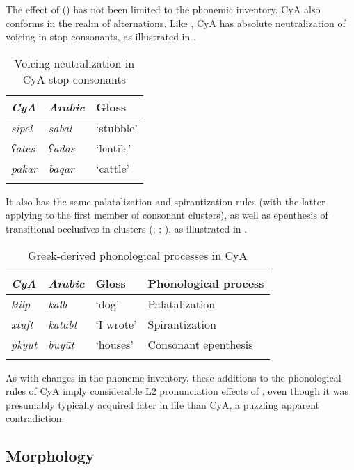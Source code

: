 \documentclass[output=paper]{langsci/langscibook}
\begin{document}
The effect of ()  has not been limited to the phonemic inventory. CyA also conforms in the realm of alternations. Like , CyA has absolute neutralization of voicing in stop consonants, as illustrated in .

\begin{table}
\begin{tabular}{>{\itshape}l>{\itshape}ll}
\lsptoprule
{\normalfont CyA} & {\normalfont Arabic} & {Gloss}\\\midrule
sipel & sabal & ‘stubble’\\
{}ʕates & ʕadas & ‘lentils’\\
pakar & baqar & ‘cattle’\\
\lspbottomrule
\end{tabular}
\caption{\label{bkm:Ref13775945}Voicing neutralization in CyA stop consonants\label{tab:walter:3}}
\end{table}

It also has the same palatalization and spirantization rules (with the latter applying to the first member of {consonant clusters}), as well as {epenthesis} of transitional occlusives in clusters (\citealt{Tsiapera1969}; \citealt{Borg1985}; \citealt{Roth2004}), as illustrated in .

\begin{table}
\begin{tabular}{>{\itshape}l>{\itshape}lll}
\lsptoprule
{\normalfont CyA} & {\normalfont Arabic} & {Gloss} & {Phonological process}\\\midrule
kʲilp & kalb & ‘dog’ & Palatalization\\
xtuft & katabt & ‘I wrote’ & Spirantization\\
pkyut & buyūt & ‘houses’ & Consonant {epenthesis}\\
\lspbottomrule
\end{tabular}
\caption{\label{bkm:Ref13776308}Greek-derived phonological processes in CyA\label{tab:walter:4}}
\end{table}

As with changes in the {phoneme} inventory, these additions to the phonological rules of CyA imply considerable L2 pronunciation effects of , even though it was presumably typically acquired later in life than CyA, a puzzling apparent contradiction.

\subsection{Morphology}
\end{document}
